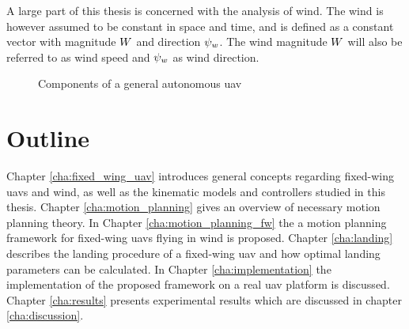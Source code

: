 A large part of this thesis is concerned with the analysis of wind. 
The wind is however assumed to be constant in space and time, and is defined as a constant vector with magnitude 
$W$ and direction $\psi_w$. The wind magnitude $W$ will also be referred to as wind speed and $\psi_w$ as wind direction. 

\begin{figure}
    \begin{center}
    \end{center}
    \caption{Components of a general autonomous \ac{uav}}
    \label{fig:autonomous}
\end{figure}

\section{Outline}
Chapter \ref{cha:fixed_wing_uav} introduces general concepts regarding fixed-wing \acp{uav} and wind, as well as the kinematic models and controllers studied in this thesis.
Chapter \ref{cha:motion_planning} gives an overview of necessary motion planning theory. In Chapter \ref{cha:motion_planning_fw} the 
a motion planning framework for fixed-wing \acp{uav} flying in wind is proposed.
Chapter \ref{cha:landing} describes the landing procedure of a fixed-wing \ac{uav} and how optimal landing parameters can be calculated. 
In Chapter \ref{cha:implementation} the implementation of the proposed framework on a real \ac{uav} platform is discussed. Chapter \ref{cha:results} presents experimental 
results which are discussed in chapter \ref{cha:discussion}.
